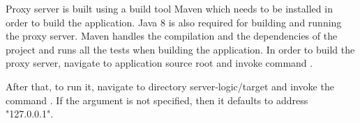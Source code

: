 \documentclass[..thesis.tex]{subfiles}
\begin{document}
Proxy server is built using a build tool Maven which needs to be installed in order to build the application.
Java 8 is also required for building and running the proxy server.
Maven handles the compilation and the dependencies of the project and runs all the tests when building the application.
In order to build the proxy server, navigate to application source root and invoke command .

\begin{sloppypar}
  After that, to run it, navigate to directory server-logic/target and invoke the command
  .
  If the  argument is not specified, then it defaults to address "127.0.0.1".
\end{sloppypar}
\end{document}
